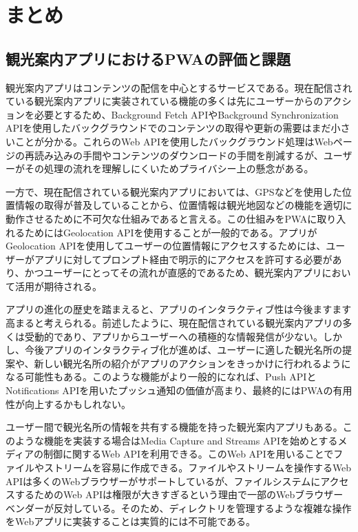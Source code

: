 \section{まとめ}\label{section:まとめ}
\subsection{観光案内アプリにおけるPWAの評価と課題}\label{subsection:観光案内アプリにおけるPWAの評価と課題}
観光案内アプリはコンテンツの配信を中心とするサービスである。現在配信されている観光案内アプリに実装されている機能の多くは先にユーザーからのアクションを必要とするため、Background Fetch APIやBackground Synchronization APIを使用したバックグラウンドでのコンテンツの取得や更新の需要はまだ小さいことが分かる。これらのWeb APIを使用したバックグラウンド処理はWebページの再読み込みの手間やコンテンツのダウンロードの手間を削減するが、ユーザーがその処理の流れを理解しにくいためプライバシー上の懸念がある。

一方で、現在配信されている観光案内アプリにおいては、GPSなどを使用した位置情報の取得が普及していることから、位置情報は観光地図などの機能を適切に動作させるために不可欠な仕組みであると言える。この仕組みをPWAに取り入れるためにはGeolocation APIを使用することが一般的である。アプリがGeolocation APIを使用してユーザーの位置情報にアクセスするためには、ユーザーがアプリに対してプロンプト経由で明示的にアクセスを許可する必要があり、かつユーザーにとってその流れが直感的であるため、観光案内アプリにおいて活用が期待される。

アプリの進化の歴史を踏まえると、アプリのインタラクティブ性は今後ますます高まると考えられる。前述したように、現在配信されている観光案内アプリの多くは受動的であり、アプリからユーザーへの積極的な情報発信が少ない。しかし、今後アプリのインタラクティブ化が進めば、ユーザーに適した観光名所の提案や、新しい観光名所の紹介がアプリのアクションをきっかけに行われるようになる可能性もある。このような機能がより一般的になれば、Push APIとNotifications APIを用いたプッシュ通知の価値が高まり、最終的にはPWAの有用性が向上するかもしれない。

ユーザー間で観光名所の情報を共有する機能を持った観光案内アプリもある。このような機能を実装する場合はMedia Capture and Streams APIを始めとするメディアの制御に関するWeb APIを利用できる。このWeb APIを用いることでファイルやストリームを容易に作成できる。ファイルやストリームを操作するWeb APIは多くのWebブラウザーがサポートしているが、ファイルシステムにアクセスするためのWeb APIは権限が大きすぎるという理由で一部のWebブラウザーベンダーが反対している。そのため、ディレクトリを管理するような複雑な操作をWebアプリに実装することは実質的には不可能である。

